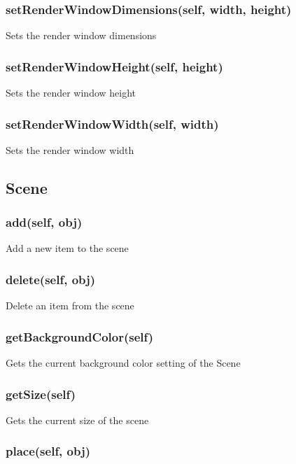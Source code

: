 \subsubsection{setRenderWindowDimensions(self, width, height)}

Sets the render window dimensions

\subsubsection{setRenderWindowHeight(self, height)}

Sets the render window height

\subsubsection{setRenderWindowWidth(self, width)}

Sets the render window width

\subsection{Scene}

\subsubsection{add(self, obj)}

Add a new item to the scene

\subsubsection{delete(self, obj)}

Delete an item from the scene

\subsubsection{getBackgroundColor(self)}

Gets the current background color setting of the Scene

\subsubsection{getSize(self)}

Gets the current size of the scene

\subsubsection{place(self, obj)}

